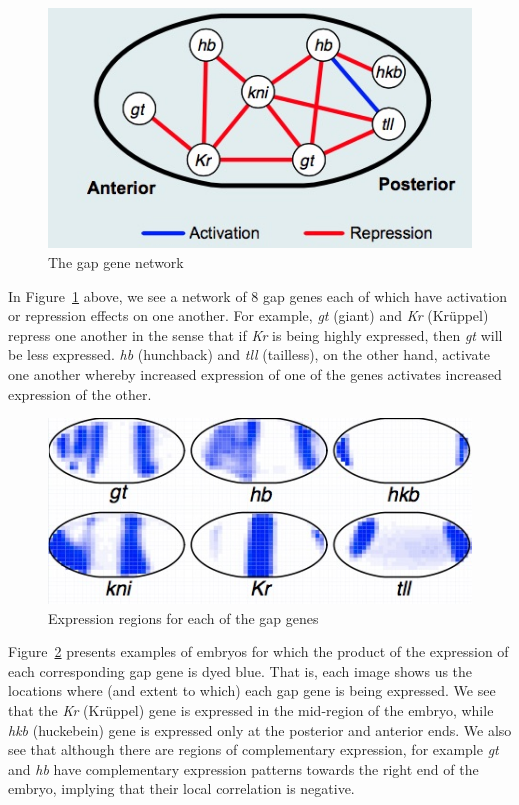 \begin{figure}[H]
\begin{center}
\includegraphics[scale=0.5]{gap_gene.jpg}
\end{center}
\caption{The gap gene network}
\label{fig:gap}
\end{figure}




In Figure~\ref{fig:gap} above, we see a network of 8 gap genes each of which have activation or repression effects on one another. For example, \emph{gt} (giant) and \emph{Kr} (Kr\"{u}ppel) repress one another in the sense that if \emph{Kr} is being highly expressed, then \emph{gt} will be less expressed. \emph{hb} (hunchback) and \emph{tll} (tailless), on the other hand, activate one another whereby increased expression of one of the genes activates increased expression of the other.


\begin{figure}[H]
\begin{center}
\includegraphics[scale=0.5]{embryos.jpg}
\end{center}
\caption{Expression regions for each of the gap genes}
\label{fig:stains}
\end{figure}


Figure~\ref{fig:stains} presents examples of embryos for which the product of the expression of each corresponding gap gene is dyed blue. That is, each image shows us the locations where (and extent to which) each gap gene is being expressed. We see that the \emph{Kr} (Kr\"{u}ppel) gene is expressed in the mid-region of the embryo, while \emph{hkb} (huckebein) gene is expressed only at the posterior and anterior ends. We also see that although there are regions of complementary expression, for example \emph{gt} and \emph{hb} have complementary expression patterns towards the right end of the embryo, implying that their local correlation is negative.





